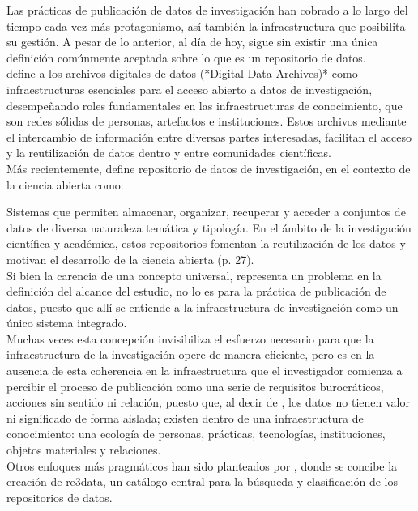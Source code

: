 \documentclass{article}
\begin{document}
Las prácticas de publicación de datos de investigación han cobrado a lo largo del tiempo cada vez más protagonismo, así también la infraestructura que posibilita su gestión. A pesar de lo anterior, al día de hoy, sigue sin existir una única definición comúnmente aceptada sobre lo que es un repositorio de datos.\\

\cite{borgman2018} define a los archivos digitales de datos (*Digital Data Archives)* como infraestructuras esenciales para el acceso abierto a datos de investigación, desempeñando roles fundamentales en las infraestructuras de conocimiento, que son redes sólidas de personas, artefactos e instituciones. Estos archivos mediante el intercambio de información entre diversas partes interesadas, facilitan el acceso y la reutilización de datos dentro y entre comunidades científicas.\\

Más recientemente, \cite{avila2024} define repositorio de datos de investigación, en el contexto de la ciencia abierta como:

Sistemas que permiten almacenar, organizar, recuperar y acceder a conjuntos de datos de diversa naturaleza temática y tipología. En el ámbito de la investigación científica y académica, estos repositorios fomentan la reutilización de los datos y motivan el desarrollo de la ciencia abierta (p. 27).\\

Si bien la carencia de una concepto universal, representa un problema en la definición del alcance del estudio, no lo es para la práctica de publicación de datos, puesto que allí se entiende a la infraestructura de investigación como un único sistema integrado.\\

Muchas veces esta concepción invisibiliza el esfuerzo necesario para que la infraestructura de la investigación opere de manera eficiente, pero es en la ausencia de esta coherencia en la infraestructura que el investigador comienza a percibir el proceso de publicación como una serie de requisitos burocráticos, acciones sin sentido ni relación, puesto que, al decir de \cite{borgman2016}, los datos no tienen valor ni significado de forma aislada; existen dentro de una infraestructura de conocimiento: una ecología de personas, prácticas, tecnologías, instituciones, objetos materiales y relaciones.\\

Otros enfoques más pragmáticos han sido planteados por \cite{pampel2013}, donde se concibe la creación de re3data, un catálogo central para la búsqueda y clasificación de los repositorios de datos.\\
\end{document}
